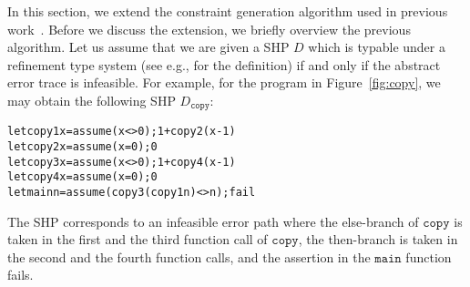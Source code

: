 In this section, we extend the constraint generation algorithm used in 
previous work~\cite{Unno2009,Terauchi2010,KobayashiPLDI2011}.  Before we 
discuss the extension, we briefly overview the previous algorithm.  Let 
us assume that we are given a SHP \(D\) which is typable under a 
refinement type system (see e.g., \cite{Unno2009} for the definition) if 
and only if the abstract error trace is infeasible.  For example, for 
the program in Figure~\ref{fig:copy}, we may obtain the following SHP 
\(D_{\texttt{copy}}\):
\begin{alltt}
let copy1 x = assume (x<>0); 1 + copy2 (x-1)
let copy2 x = assume (x=0); 0
let copy3 x = assume (x<>0); 1 + copy4 (x-1)
let copy4 x = assume (x=0); 0
let main n = assume (copy3 (copy1 n) <> n); fail
\end{alltt}
The SHP corresponds to an infeasible error path where the else-branch of 
\(\texttt{copy}\) is taken in the first and the third function call of 
\(\texttt{copy}\), the then-branch is taken in the second and the fourth 
function calls, and the assertion in the \(\texttt{main}\) function 
fails.

